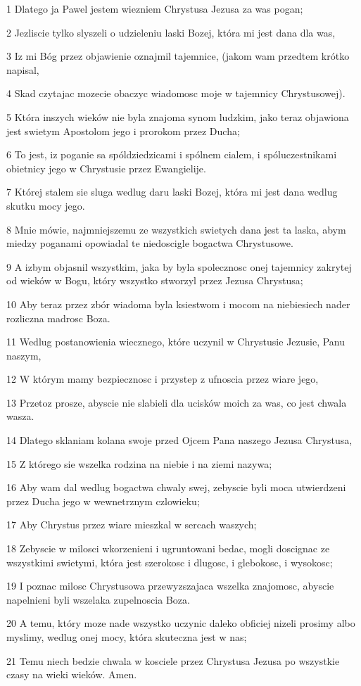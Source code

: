 \par 1 Dlatego ja Pawel jestem wiezniem Chrystusa Jezusa za was pogan;
\par 2 Jezliscie tylko slyszeli o udzieleniu laski Bozej, która mi jest dana dla was,
\par 3 Iz mi Bóg przez objawienie oznajmil tajemnice, (jakom wam przedtem krótko napisal,
\par 4 Skad czytajac mozecie obaczyc wiadomosc moje w tajemnicy Chrystusowej).
\par 5 Która inszych wieków nie byla znajoma synom ludzkim, jako teraz objawiona jest swietym Apostolom jego i prorokom przez Ducha;
\par 6 To jest, iz poganie sa spóldziedzicami i spólnem cialem, i spóluczestnikami obietnicy jego w Chrystusie przez Ewangielije.
\par 7 Której stalem sie sluga wedlug daru laski Bozej, która mi jest dana wedlug skutku mocy jego.
\par 8 Mnie mówie, najmniejszemu ze wszystkich swietych dana jest ta laska, abym miedzy poganami opowiadal te niedoscigle bogactwa Chrystusowe.
\par 9 A izbym objasnil wszystkim, jaka by byla spolecznosc onej tajemnicy zakrytej od wieków w Bogu, który wszystko stworzyl przez Jezusa Chrystusa;
\par 10 Aby teraz przez zbór wiadoma byla ksiestwom i mocom na niebiesiech nader rozliczna madrosc Boza.
\par 11 Wedlug postanowienia wiecznego, które uczynil w Chrystusie Jezusie, Panu naszym,
\par 12 W którym mamy bezpiecznosc i przystep z ufnoscia przez wiare jego,
\par 13 Przetoz prosze, abyscie nie slabieli dla ucisków moich za was, co jest chwala wasza.
\par 14 Dlatego sklaniam kolana swoje przed Ojcem Pana naszego Jezusa Chrystusa,
\par 15 Z którego sie wszelka rodzina na niebie i na ziemi nazywa;
\par 16 Aby wam dal wedlug bogactwa chwaly swej, zebyscie byli moca utwierdzeni przez Ducha jego w wewnetrznym czlowieku;
\par 17 Aby Chrystus przez wiare mieszkal w sercach waszych;
\par 18 Zebyscie w milosci wkorzenieni i ugruntowani bedac, mogli doscignac ze wszystkimi swietymi, która jest szerokosc i dlugosc, i glebokosc, i wysokosc;
\par 19 I poznac milosc Chrystusowa przewyzszajaca wszelka znajomosc, abyscie napelnieni byli wszelaka zupelnoscia Boza.
\par 20 A temu, który moze nade wszystko uczynic daleko obficiej nizeli prosimy albo myslimy, wedlug onej mocy, która skuteczna jest w nas;
\par 21 Temu niech bedzie chwala w kosciele przez Chrystusa Jezusa po wszystkie czasy na wieki wieków. Amen.

